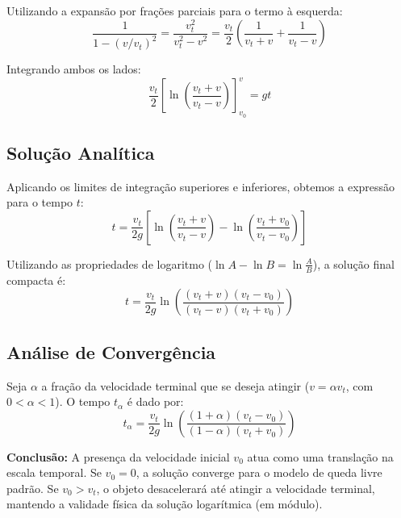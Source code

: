 Utilizando a expansão por frações parciais para o termo à esquerda:
\begin{equation}
    \frac{1}{1 - (v/v_t)^2} = \frac{v_t^2}{v_t^2 - v^2} = \frac{v_t}{2} \left( \frac{1}{v_t + v} + \frac{1}{v_t - v} \right)
\end{equation}

Integrando ambos os lados:
\begin{equation}
    \frac{v_t}{2} \left[ \ln \left( \frac{v_t + v}{v_t - v} \right) \right]_{v_0}^{v} = gt
\end{equation}

\subsection*{Solução Analítica}
Aplicando os limites de integração superiores e inferiores, obtemos a expressão para o tempo $t$:
\begin{equation}
    t = \frac{v_t}{2g} \left[ \ln \left( \frac{v_t + v}{v_t - v} \right) - \ln \left( \frac{v_t + v_0}{v_t - v_0} \right) \right]
\end{equation}

Utilizando as propriedades de logaritmo ($\ln A - \ln B = \ln \frac{A}{B}$), a solução final compacta é:
\begin{equation}
    t = \frac{v_t}{2g} \ln \left( \frac{(v_t + v)(v_t - v_0)}{(v_t - v)(v_t + v_0)} \right)
\end{equation}

\subsection*{Análise de Convergência}
Seja $\alpha$ a fração da velocidade terminal que se deseja atingir ($v = \alpha v_t$, com $0 < \alpha < 1$). O tempo $t_\alpha$ é dado por:
\begin{equation}
    t_{\alpha} = \frac{v_t}{2g} \ln \left( \frac{(1 + \alpha)(v_t - v_0)}{(1 - \alpha)(v_t + v_0)} \right)
\end{equation}

\textbf{Conclusão:} A presença da velocidade inicial $v_0$ atua como uma translação na escala temporal. Se $v_0 = 0$, a solução converge para o modelo de queda livre padrão. Se $v_0 > v_t$, o objeto desacelerará até atingir a velocidade terminal, mantendo a validade física da solução logarítmica (em módulo).
